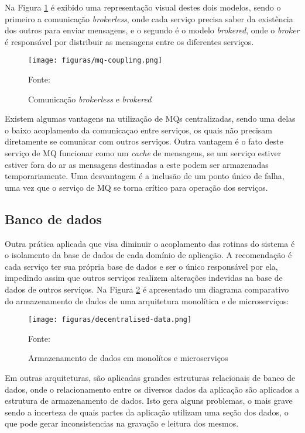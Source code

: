Na Figura \ref{fig:mq-coupling} é exibido uma representação visual destes dois
modelos, sendo o primeiro a comunicação \emph{brokerless}, onde cada serviço
precisa saber da existência dos outros para enviar mensagens, e o segundo é
o modelo \emph{brokered}, onde o \emph{broker} é responsável por distribuir
as mensagens entre os diferentes serviços.

\begin{figure}[H]
	\centering
	\caption{Comunicação \emph{brokerless} e \emph{brokered}}
	\texttt{[image: figuras/mq-coupling.png]}

	\label{fig:mq-coupling}
	\footnotesize Fonte: 
\end{figure}

Existem algumas vantagens na utilização de \acp{MQ} centralizadas, sendo uma
delas o baixo acoplamento da comunicaçao entre serviços, os quais não precisam
diretamente se comunicar com outros serviços. Outra vantagem é o fato deste
serviço de \ac{MQ} funcionar como um \emph{cache} de mensagens, se um serviço
estiver estiver fora do ar as mensagens destinadas a este podem ser armazenadas
temporariamente. Uma desvantagem é a inclusão de um ponto único de falha,
uma vez que o serviço de \ac{MQ} se torna crítico para operação dos serviços.

\subsection{Banco de dados}

Outra prática aplicada que visa diminuir o acoplamento das rotinas do sistema
é o isolamento da base de dados de cada domínio de aplicação. A recomendação é
cada serviço ter sua própria base de dados e ser o único responsável por ela,
impedindo assim que outros serviços realizem alterações indevidas na base de
dados de outros serviços. Na Figura \ref{fig:db-monolith-microservices}
é apresentado um diagrama comparativo do armazenamento de dados de uma
arquitetura monolítica e de microserviços:

\begin{figure}[H]
	\centering
	\caption{Armazenamento de dados em monolítos e microserviços}
	\texttt{[image: figuras/decentralised-data.png]}

	\label{fig:db-monolith-microservices}
	\footnotesize Fonte: 
\end{figure}

Em outras arquiteturas, são aplicadas grandes estruturas relacionais de banco
de dados, onde o relacionamento entre os diversos dados da aplicação são
aplicados a estrutura de armazenamento de dados. Isto gera alguns problemas,
o mais grave sendo a incerteza de quais partes da aplicação utilizam uma
seção dos dados, o que pode gerar inconsistencias na gravação e leitura dos
mesmos.

